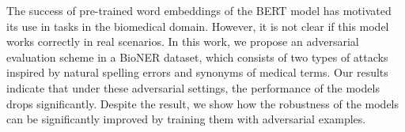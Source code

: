 The success of pre-trained word embeddings of the BERT model has motivated its use in tasks in the biomedical domain. However, it is not clear if this model works correctly in real scenarios. In this work, we propose an adversarial evaluation scheme in a BioNER dataset, which consists of two types of attacks inspired by natural spelling errors and synonyms of medical terms. Our results indicate that under these adversarial settings, the performance of the models drops significantly. Despite the result,  we show how the robustness of the models can be significantly improved by training them with adversarial examples.
